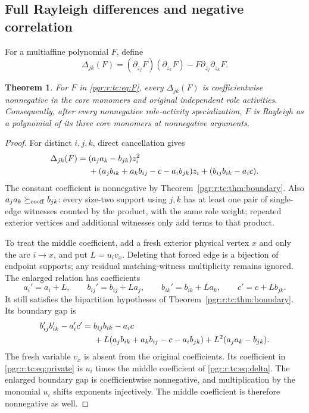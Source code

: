 \documentclass[11pt]{article}
\numberwithin{equation}{section}
\newtheorem{theorem}{Theorem}[section]\newtheorem{lemma}[theorem]{Lemma}\newtheorem{proposition}[theorem]{Proposition}\newtheorem{corollary}[theorem]{Corollary}
\theoremstyle{definition}\newtheorem{definition}[theorem]{Definition}\newtheorem{remark}[theorem]{Remark}
\newcommand{\coefge}{\mathrel{\succeq_{\rm coeff}}} %
\begin{document}
\subsection{Full Rayleigh differences and negative correlation}\label{pgr:r:tc:sec:full}
For a multiaffine polynomial $F$, define
\[
 \Delta_{jk}(F)=(\partial_{z_j}F)(\partial_{z_k}F)
                   -F\partial_{z_j}\partial_{z_k}F.
\]
\begin{theorem}\label{pgr:r:tc:thm:full}
For $F$ in \eqref{pgr:r:tc:eq:F}, every $\Delta_{jk}(F)$ is coefficientwise
nonnegative in the core monomers and original independent role activities.
Consequently, after every nonnegative role-activity specialization, $F$ is
Rayleigh as a polynomial of its three core monomers at nonnegative arguments.
\end{theorem}
\begin{proof}
For distinct $i,j,k$, direct cancellation gives
\begin{align}\label{pgr:r:tc:eq:delta}
 \Delta_{jk}(F)={}&(a_ja_k-b_{jk})z_i^2\notag\\
 &+(a_jb_{ik}+a_kb_{ij}-c-a_ib_{jk})z_i
 +(b_{ij}b_{ik}-a_ic).
\end{align}
The constant coefficient is nonnegative by Theorem~\ref{pgr:r:tc:thm:boundary}.
Also $a_ja_k\coefge b_{jk}$: every size-two support using $j,k$ has at
least one pair of single-edge witnesses counted by the product, with the
same role weight; repeated exterior vertices and additional witnesses only
add terms to that product.

To treat the middle coefficient, add a fresh exterior physical vertex $x$
and only the arc $i\to x$, and put $L=u_iv_x$. Deleting that forced edge is
a bijection of endpoint supports; any residual matching-witness multiplicity
remains ignored. The enlarged relation has coefficients
\[
 a_i'=a_i+L,\qquad b_{ij}'=b_{ij}+La_j,\qquad
 b_{ik}'=b_{ik}+La_k,\qquad c'=c+Lb_{jk}.
\]
It still satisfies the bipartition hypotheses of Theorem~\ref{pgr:r:tc:thm:boundary}.
Its boundary gap is
\begin{align}\label{pgr:r:tc:eq:private}
 b_{ij}'b_{ik}'-a_i'c'={}&b_{ij}b_{ik}-a_ic\notag\\
 &+L(a_jb_{ik}+a_kb_{ij}-c-a_ib_{jk})
 +L^2(a_ja_k-b_{jk}).
\end{align}
The fresh variable $v_x$ is absent from the original coefficients. Its
coefficient in \eqref{pgr:r:tc:eq:private} is $u_i$ times the middle coefficient of
\eqref{pgr:r:tc:eq:delta}. The enlarged boundary gap is coefficientwise nonnegative,
and multiplication by the monomial $u_i$ shifts exponents injectively.
The middle coefficient is therefore nonnegative as well.
\end{proof}
\end{document}
